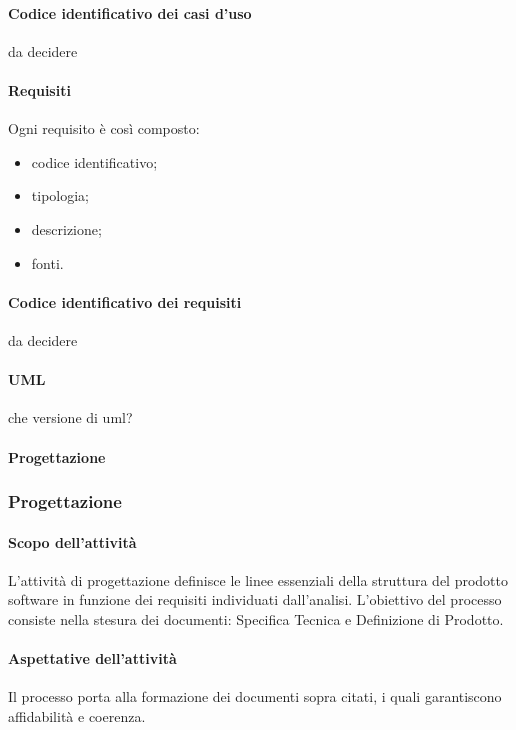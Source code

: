  \paragraph{Codice identificativo dei casi d'uso}
da decidere
 \paragraph{Requisiti}
 Ogni requisito è così composto:
  \begin{itemize}
  \item codice identificativo;
  \item tipologia;
  \item descrizione;
  \item fonti.
 \end{itemize}
 \paragraph{Codice identificativo dei requisiti}
 da decidere
 \paragraph{UML}
 che versione di uml?
 \paragraph{Progettazione}

\subsubsection{Progettazione}
 \paragraph{Scopo dell'attività}
L'attività di progettazione definisce le linee essenziali della struttura del prodotto software in
funzione dei requisiti individuati dall'analisi. L'obiettivo del processo consiste nella stesura dei
documenti: Specifica Tecnica e Definizione di Prodotto.
 \paragraph{Aspettative dell'attività}
Il processo porta alla formazione dei documenti sopra citati, i quali garantiscono affidabilità e
coerenza.
